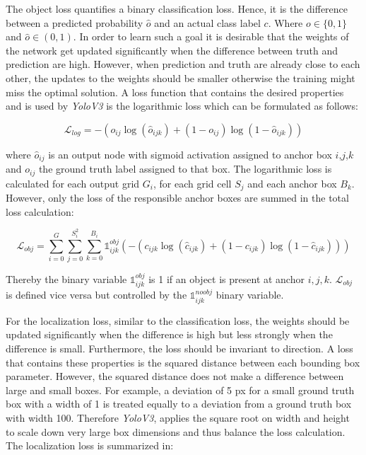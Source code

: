 	The object loss quantifies a binary classification loss. Hence, it is the difference between a predicted probability $\hat o$ and an actual class label $c$. Where $o \in \{0,1\}$ and $\hat o \in (0,1)$. In order to learn such a goal it is desirable that the weights of the network get updated significantly when the difference between truth and prediction are high. However, when prediction and truth are already close to each other, the updates to the weights should be smaller otherwise the training might miss the optimal solution. A loss function that contains the desired properties and is used by \textit{YoloV3} is the logarithmic loss which can be formulated as follows:
	
	\begin{equation}
		\mathcal{L}_{log} = -(o_{ij}\log(\hat o_{ijk}) + (1 - o_{ij})\log(1 - \hat o_{ijk}))
	\end{equation}
	
	where $\hat o_{ij}$ is an output node with sigmoid activation assigned to anchor box $i$,$j$,$k$ and $ o_{ij}$ the ground truth label assigned to that box. The logarithmic loss is calculated for each output grid $G_i$, for each grid cell $S_j$ and each anchor box $B_k$. However, only the loss of the responsible anchor boxes are summed in the total loss calculation:
	
	\begin{equation}
		\mathcal{L}_{obj} = \sum_{i=0}^{G}\sum_{j=0}^{S_i^2}\sum_{k=0}^{B_i} \mathbb{1}_{ijk}^{obj}(-(c_{ijk}\log(\hat c_{ijk}) + (1 - c_{ijk})\log(1 - \hat c_{ijk})))
	\end{equation}
	
	Thereby the  binary variable $\mathbb{1}_{ijk}^{obj}$ is 1 if an object is present at anchor $i,j,k$. $\mathcal{L}_{obj}$ is defined vice versa but controlled by the $\mathbb{1}_{ijk}^{noobj}$ binary variable.

	For the localization loss, similar to the classification loss, the weights should be updated significantly when the difference is high but less strongly when the difference is small. Furthermore, the loss should be invariant to direction. A loss that contains these properties is the squared distance between each bounding box parameter. However, the squared distance does not make a difference between large and small boxes. For example, a deviation of 5 px for a small ground truth box with a width of 1 is treated equally to a deviation from a ground truth box with width 100. Therefore \textit{YoloV3}, applies the square root on width and height to scale down very large box dimensions and thus balance the loss calculation. The localization loss is summarized in:
	
